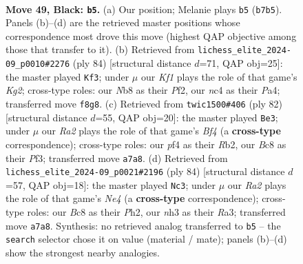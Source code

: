 \documentclass[11pt]{article}
\begin{document}
\clearpage

\begin{figure}[p]\centering
\begin{subfigure}{0.46\textwidth}\centering
\resizebox{\linewidth}{!}{%
\newchessgame
\chessboard[
  setfen={1nb2k2/rp2n3/4p3/5p1B/PpN2P2/1P4PN/6KP/7R b - - 6 49},
  showmover=false,
  pgfstyle=straightmove, color=movearrow, markmove={b7-b5}
]}
\caption{}
\end{subfigure}\hfill
\begin{subfigure}{0.46\textwidth}\centering
\resizebox{\linewidth}{!}{%
\newchessgame
\chessboard[
  setfen={4n3/4kp1p/2rp2p1/2p5/P1N3P1/1P1R3P/5PK1/8 w - - 2 43},
  showmover=false,
  pgfstyle=straightmove, color=movearrow, markmove={g2-f3}
]}
\caption{}
\end{subfigure}
\\[4pt]
\begin{subfigure}{0.46\textwidth}\centering
\resizebox{\linewidth}{!}{%
\newchessgame
\chessboard[
  setfen={4n3/r2b1kp1/5p1p/8/2p1PB2/2P2P2/1R2NKPP/8 w - - 4 42},
  showmover=false,
  pgfstyle=straightmove, color=movearrow, markmove={f4-e3}
]}
\caption{}
\end{subfigure}\hfill
\begin{subfigure}{0.46\textwidth}\centering
\resizebox{\linewidth}{!}{%
\newchessgame
\chessboard[
  setfen={8/1p2kp1p/p1bpp2b/P2n4/4N3/R4BP1/2K4P/8 w - - 4 43},
  showmover=false,
  pgfstyle=straightmove, color=movearrow, markmove={e4-c3}
]}
\caption{}
\end{subfigure}
\caption{\textbf{Move 49, Black: \texttt{b5}.} (a) Our position; Melanie plays \texttt{b5} (\texttt{b7b5}). Panels (b)--(d) are the retrieved master positions whose correspondence most drove this move (highest QAP objective among those that transfer to it). (b) Retrieved from \texttt{lichess\_elite\_2024-09\_p0010\#2276} (ply 84) [structural distance $d$=71, QAP obj=25]: the master played \texttt{Kf3}; under $\mu$ our \emph{Kf1} plays the role of that game's \emph{Kg2}; cross-type roles: our \emph{N}b8 as their \emph{P}f2, our \emph{n}c4 as their \emph{P}a4; transferred move \texttt{f8g8}. (c) Retrieved from \texttt{twic1500\#406} (ply 82) [structural distance $d$=55, QAP obj=20]: the master played \texttt{Be3}; under $\mu$ our \emph{Ra2} plays the role of that game's \emph{Bf4} (a \textbf{cross-type} correspondence); cross-type roles: our \emph{p}f4 as their \emph{R}b2, our \emph{B}c8 as their \emph{P}f3; transferred move \texttt{a7a8}. (d) Retrieved from \texttt{lichess\_elite\_2024-09\_p0021\#2196} (ply 84) [structural distance $d$=57, QAP obj=18]: the master played \texttt{Nc3}; under $\mu$ our \emph{Ra2} plays the role of that game's \emph{Ne4} (a \textbf{cross-type} correspondence); cross-type roles: our \emph{B}c8 as their \emph{P}h2, our \emph{n}h3 as their \emph{R}a3; transferred move \texttt{a7a8}. Synthesis: no retrieved analog transferred to \texttt{b5} -- the \texttt{search} selector chose it on value (material / mate); panels (b)--(d) show the strongest nearby analogies.}
\label{fig:thought-m97}
\end{figure}
\end{document}
